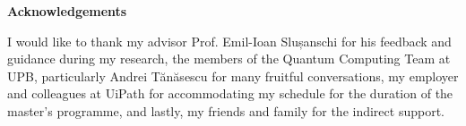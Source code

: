 {\noindent\Large\textbf{Acknowledgements}}
\vspace*{5mm}

\noindent I would like to thank my advisor Prof. Emil-Ioan Slușanschi for his feedback and guidance during my research, the members of the Quantum Computing Team at UPB, particularly Andrei Tănăsescu for many fruitful conversations, my employer and colleagues at UiPath for accommodating my schedule for the duration of the master's programme, and lastly, my friends and family for the indirect support.
